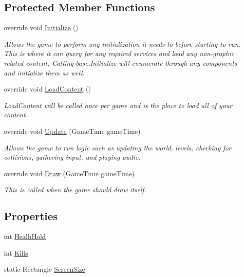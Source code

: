 \subsection*{Protected Member Functions}
\begin{DoxyCompactItemize}
\item 
override void \mbox{\hyperlink{class_game2_1_1_game_world_a8488fd97f682ca3cc0d3defe5094bb7f}{Initialize}} ()
\begin{DoxyCompactList}\small\item\em Allows the game to perform any initialization it needs to before starting to run. This is where it can query for any required services and load any non-\/graphic related content. Calling base.\+Initialize will enumerate through any components and initialize them as well. \end{DoxyCompactList}\item 
override void \mbox{\hyperlink{class_game2_1_1_game_world_a4bf53e37ff1497b08076b29ba9cc6494}{Load\+Content}} ()
\begin{DoxyCompactList}\small\item\em Load\+Content will be called once per game and is the place to load all of your content. \end{DoxyCompactList}\item 
override void \mbox{\hyperlink{class_game2_1_1_game_world_a653a301b00ac7b3fd16260d5c30d8f36}{Update}} (Game\+Time game\+Time)
\begin{DoxyCompactList}\small\item\em Allows the game to run logic such as updating the world, levels, checking for collisions, gathering input, and playing audio. \end{DoxyCompactList}\item 
override void \mbox{\hyperlink{class_game2_1_1_game_world_a2d3b767def6473b528eb4ea3bf54e37d}{Draw}} (Game\+Time game\+Time)
\begin{DoxyCompactList}\small\item\em This is called when the game should draw itself. \end{DoxyCompactList}\end{DoxyCompactItemize}
\subsection*{Properties}
\begin{DoxyCompactItemize}
\item 
int \mbox{\hyperlink{class_game2_1_1_game_world_a8289db0e2223e4d88fca02dd8a4281b3}{Healh\+Hold}}
\item 
int \mbox{\hyperlink{class_game2_1_1_game_world_a9a7020d26597ee1ff08e5ade7686a482}{Kills}}
\item 
static Rectangle \mbox{\hyperlink{class_game2_1_1_game_world_a33e4b367438dde0cb88d9fab8439c0e5}{Screen\+Size}}
\end{DoxyCompactItemize}


